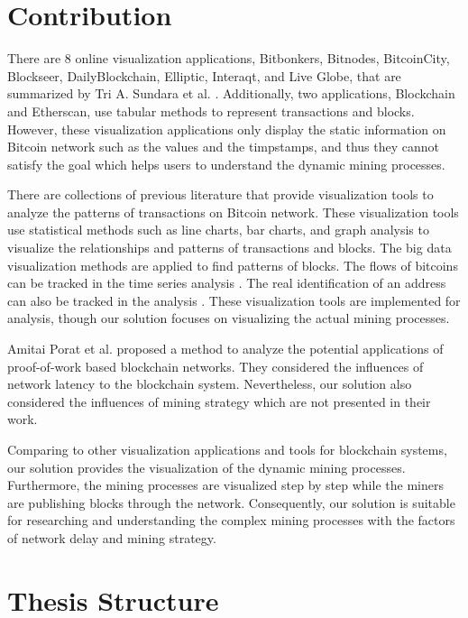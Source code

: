 \section{Contribution}


There are 8 online visualization applications, Bitbonkers, Bitnodes, BitcoinCity, Blockseer, DailyBlockchain, Elliptic, Interaqt, and Live Globe, that are summarized by Tri A. Sundara et al. \cite{Sundara2017}. Additionally, two applications, Blockchain and Etherscan, use tabular methods to represent transactions and blocks. However, these visualization applications only display the static information on Bitcoin network such as the values and the timpstamps, and thus they cannot satisfy the goal which helps users to understand the dynamic mining processes. 

There are collections of previous literature that provide visualization tools to analyze the patterns of transactions on Bitcoin network. These visualization tools \cite{Kuzuno2017, Saublet2015, Fleder2015, Baumann2014} use statistical methods such as line charts, bar charts, and graph analysis to visualize the relationships and patterns of transactions and blocks. The big data visualization methods are applied \cite{McGinn2016} to find patterns of blocks. The flows of bitcoins can be tracked in the time series analysis \cite{Battista2015}. The real identification of an address can also be tracked in the analysis \cite{Kuzuno2017}. These visualization tools are implemented for analysis, though our solution focuses on visualizing the actual mining processes. 
 
Amitai Porat et al. \cite{Porat} proposed a method to analyze the potential applications of proof-of-work based blockchain networks. They considered the influences of network latency to the blockchain system. Nevertheless, our solution also considered the influences of mining strategy which are not presented in their work.

Comparing to other visualization applications and tools for blockchain systems, our solution provides the visualization of the dynamic mining processes. Furthermore, the mining processes are visualized step by step while the miners are publishing blocks through the network. Consequently, our solution is suitable for researching and understanding the complex mining processes with the factors of network delay and mining strategy.

\section{Thesis Structure}


